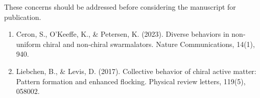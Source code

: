 \documentclass{article}
\begin{document}
These concerns should be addressed before considering the manuscript for publication.

\begin{enumerate}
    \renewcommand{\theenumi}{[\arabic{enumi}]}
    \renewcommand{\labelenumi}{\theenumi}
    \item Ceron, S., O'Keeffe, K., \& Petersen, K. (2023). Diverse behaviors in non-uniform chiral and non-chiral swarmalators. Nature Communications, 14(1), 940.
    \item Liebchen, B., \& Levis, D. (2017). Collective behavior of chiral active matter: Pattern formation and enhanced flocking. Physical review letters, 119(5), 058002.
\end{enumerate}
\end{document}
